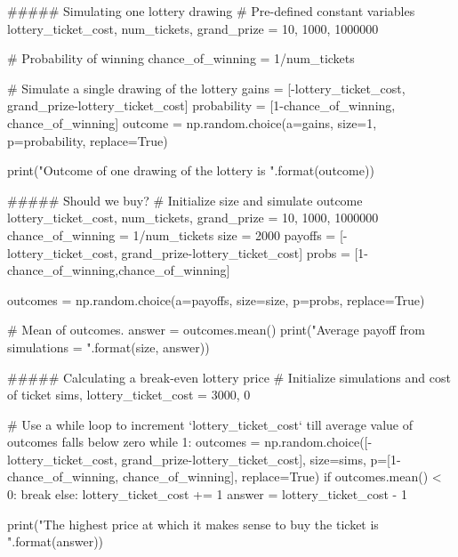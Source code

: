 ##### Simulating one lottery drawing
# Pre-defined constant variables
lottery_ticket_cost, num_tickets, grand_prize = 10, 1000, 1000000

# Probability of winning
chance_of_winning = 1/num_tickets

# Simulate a single drawing of the lottery
gains = [-lottery_ticket_cost, grand_prize-lottery_ticket_cost]
probability = [1-chance_of_winning, chance_of_winning]
outcome = np.random.choice(a=gains, size=1, p=probability, replace=True)

print("Outcome of one drawing of the lottery is {}".format(outcome))

##### Should we buy?
# Initialize size and simulate outcome
lottery_ticket_cost, num_tickets, grand_prize = 10, 1000, 1000000
chance_of_winning = 1/num_tickets
size = 2000
payoffs = [-lottery_ticket_cost, grand_prize-lottery_ticket_cost]
probs = [1-chance_of_winning,chance_of_winning]

outcomes = np.random.choice(a=payoffs, size=size, p=probs, replace=True)

# Mean of outcomes.
answer = outcomes.mean()
print("Average payoff from {} simulations = {}".format(size, answer))

##### Calculating a break-even lottery price
# Initialize simulations and cost of ticket
sims, lottery_ticket_cost = 3000, 0

# Use a while loop to increment `lottery_ticket_cost` till average value of outcomes falls below zero
while 1:
    outcomes = np.random.choice([-lottery_ticket_cost, grand_prize-lottery_ticket_cost],
                 size=sims, p=[1-chance_of_winning, chance_of_winning], replace=True)
    if outcomes.mean() < 0:
        break
    else:
        lottery_ticket_cost += 1
answer = lottery_ticket_cost - 1

print("The highest price at which it makes sense to buy the ticket is {}".format(answer))

